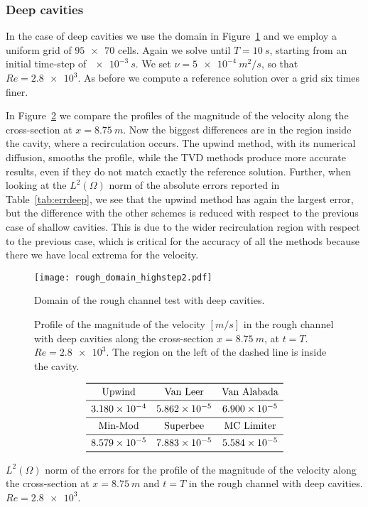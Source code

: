\subsubsection{Deep cavities}
In the case of deep cavities we use the domain in Figure~\ref{fig:roughdomdeep} 
and we employ a uniform grid of $\num{95x70}$ cells. Again we solve until 
$T=\SI{10}{s}$, starting from an initial time-step of $\SI{e-3}{s}$. We set 
$\nu=\SI{5e-4}{m^2/s}$, so that $Re=\num{2.8e3}$. As before we compute a 
reference solution over a grid six times finer.

In Figure~\ref{fig:linecompdeep} we compare the profiles of the magnitude of 
the velocity along the cross-section at $x=\SI{8.75}{m}$. Now the biggest 
differences 
are in the region inside the cavity, where a recirculation occurs. The upwind 
method, with its numerical diffusion, smooths the profile, while the TVD 
methods produce more accurate results, even if they do not match exactly the 
reference solution.
Further, when looking at the $L^2(\Omega)$ norm of the absolute errors reported in 
Table~\ref{tab:errdeep}, we see that the upwind method has again the largest error, 
but the difference with the other schemes is reduced with respect to the 
previous case of shallow cavities. This is due to the wider recirculation region with respect to the previous case, which is critical for the accuracy of all the methods because there we have local extrema for the velocity.
\begin{figure}
	\centering
	\texttt{[image: rough\_domain\_highstep2.pdf]}
	\caption[Domain of the rough channel test with deep cavities]{Domain of the 
	rough channel test with deep cavities.}
	\label{fig:roughdomdeep}
\end{figure}
\begin{figure}
	\centering
	
	\caption[Profile of the magnitude of the velocity in the rough channel with 
	deep cavities at $Re=\num{2.8e3}$]{Profile of the magnitude of the velocity 
		$[\si{m/s}]$ in the rough channel with deep cavities along the 
		cross-section 
		$x=\SI{8.75}{m}$, at $t=T$. $Re=\num{2.8e3}$. The region on 
		the 
		left of the dashed line is inside the cavity.}
	\label{fig:linecompdeep}
\end{figure}
\begin{table}
	\centering
	\[
	\begin{array}{ccc}
	\toprule
	\text{Upwind} & \text{Van Leer} & \text{Van Alabada}\\
	\midrule
	\num{3.180e-4} & \num{5.862e-5} & \num{6.900e-5}\\
	\midrule
	\text{Min-Mod} & \text{Superbee} & \text{MC Limiter} \\
	\midrule
	\num{8.579e-5} & \num{7.883e-5} & \num{5.584e-5}\\
	\bottomrule
	\end{array}
	\]
	\caption[$L^2(\Omega)$ norm of the errors for the profile of the magnitude 
	of the 
	velocity in 
	the rough channel with deep cavities]{$L^2(\Omega)$ norm of the errors for 
	the profile 
	of the 
	magnitude of the velocity along the cross-section at $x=\SI{8.75}{m}$ and 
	$t=T$ in the rough channel with deep cavities. $Re = \num{2.8e3}$.}
	\label{tab:errdeep}
\end{table}
%
